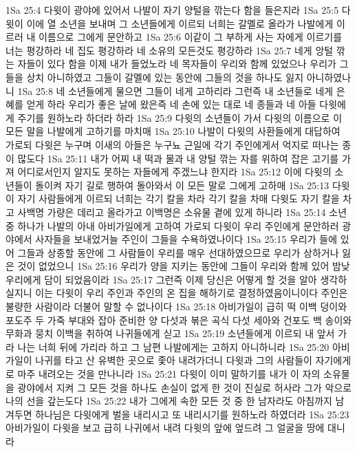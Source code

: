 1Sa 25:4  다윗이 광야에 있어서 나발이 자기 양털을 깎는다 함을 들은지라
1Sa 25:5  다윗이 이에 열 소년을 보내며 그 소년들에게 이르되 너희는 갈멜로 올라가 나발에게 이르러 내 이름으로 그에게 문안하고
1Sa 25:6  이같이 그 부하게 사는 자에게 이르기를 너는 평강하라 네 집도 평강하라 네 소유의 모든것도 평강하라
1Sa 25:7  네게 앙털 깎는 자들이 있다 함을 이제 내가 들었노라 네 목자들이 우리와 함께 있었으나 우리가 그들을 상치 아니하였고 그들이 갈멜에 있는 동안에 그들의 것을 하나도 잃지 아니하였나니
1Sa 25:8  네 소년들에게 물으면 그들이 네게 고하리라 그런즉 내 소년들로 네게 은혜를 얻게 하라 우리가 좋은 날에 왔은즉 네 손에 있는 대로 네 종들과 네 아들 다윗에게 주기를 원하노라 하더라 하라
1Sa 25:9  다윗의 소년들이 가서 다윗의 이름으로 이 모든 말을 나발에게 고하기를 마치매
1Sa 25:10  나발이 다윗의 사환들에게 대답하여 가로되 다윗은 누구며 이새의 아들은 누구뇨 근일에 각기 주인에게서 억지로 떠나는 종이 많도다
1Sa 25:11  내가 어찌 내 떡과 물과 내 양털 깎는 자를 위하여 잡은 고기를 가져 어디로서인지 알지도 못하는 자들에게 주겠느냐 한지라
1Sa 25:12  이에 다윗의 소년들이 돌이켜 자기 길로 행하여 돌아와서 이 모든 말로 그에게 고하매
1Sa 25:13  다윗이 자기 사람들에게 이르되 너희는 각기 칼을 차라 각기 칼을 차매 다윗도 자기 칼을 차고 사백명 가량은 데리고 올라가고 이백명은 소유물 곁에 있게 하니라
1Sa 25:14  소년중 하나가 나발의 아내 아비가일에게 고하여 가로되 다윗이 우리 주인에게 문안하러 광야에서 사자들을 보내었거늘 주인이 그들을 수욕하였나이다
1Sa 25:15  우리가 들에 있어 그들과 상종할 동안에 그 사람들이 우리를 매우 선대하였으므로 우리가 상하거나 잃은 것이 없었으니
1Sa 25:16  우리가 양을 지키는 동안에 그들이 우리와 함께 있어 밤낮 우리에게 담이 되었음이라
1Sa 25:17  그런즉 이제 당신은 어떻게 할 것을 알아 생각하실지니 이는 다윗이 우리 주인과 주인의 온 집을 해하기로 결정하였음이니이다 주인은 불량한 사람이라 더불어 말할 수 없나이다
1Sa 25:18  아비가일이 급히 떡 이백 덩이와 포도주 두 가죽 부대와 잡아 준비한 양 다섯과 볶은 곡식 다섯 세아와 건포도 백 송이와 무화과 뭉치 이백을 취하여 나귀들에게 싣고
1Sa 25:19  소년들에게 이르되 내 앞서 가라 나는 너희 뒤에 가리라 하고 그 남편 나발에게는 고하지 아니하니라
1Sa 25:20  아비가일이 나귀를 타고 산 유벽한 곳으로 좇아 내려가더니 다윗과 그의 사람들이 자기에게로 마주 내려오는 것을 만나니라
1Sa 25:21  다윗이 이미 말하기를 내가 이 자의 소유물을 광야에서 지켜 그 모든 것을 하나도 손실이 없게 한 것이 진실로 허사라 그가 악으로 나의 선을 갚는도다
1Sa 25:22  내가 그에게 속한 모든 것 중 한 남자라도 아침까지 남겨두면 하나님은 다윗에게 벌을 내리시고 또 내리시기를 원하노라 하였더라
1Sa 25:23  아비가일이 다윗을 보고 급히 나귀에서 내려 다윗의 앞에 엎드려 그 얼굴을 땅에 대니라
